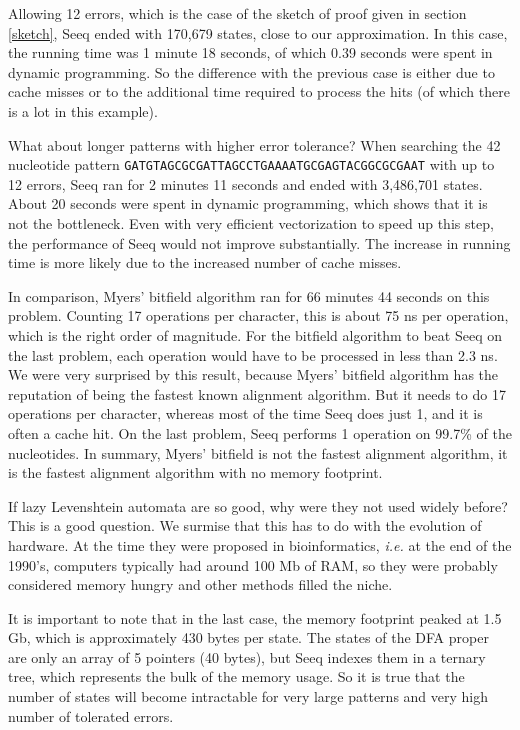 \documentclass[12pt]{article}
\begin{document}
Allowing 12 errors, which is the case of the sketch
of proof given in section \ref{sketch}, Seeq ended with 170,679 states,
close to our approximation. In this case, the running time
was 1 minute 18 seconds, of which 0.39 seconds were spent in dynamic
programming. So the difference with the previous case is either
due to cache misses or to the additional time required to process
the hits (of which there is a lot in this example).

What about longer patterns with higher error tolerance?
When searching the 42 nucleotide pattern
\texttt{GATGTAGCGCGATTAGCCTGAAAATGCGAGTACGGCGCGAAT} with
up to 12 errors, Seeq ran for 2 minutes 11 seconds and ended with
3,486,701 states. About 20 seconds were spent in dynamic programming,
which shows that it is not the bottleneck.
Even with very efficient vectorization to speed up this step, the
performance of Seeq would not improve substantially. The increase
in running time is more likely due to the increased number of cache
misses.

In comparison, Myers' bitfield algorithm ran for 66 minutes
44 seconds on this problem. Counting 17 operations per character,
this is about 75 ns per operation, which is the right order of
magnitude. For the bitfield algorithm to beat Seeq on the last problem,
each operation would have to be processed in less than 2.3 ns. We
were very surprised by this result, because Myers' bitfield
algorithm has the reputation of being the fastest known alignment
algorithm. But it needs to do 17 operations per character, whereas
most of the time Seeq does just 1, and it is often a cache hit. On
the last problem, Seeq performs 1 operation on 99.7\% of the
nucleotides. In summary, Myers' bitfield is not the fastest
alignment algorithm, it is the fastest alignment algorithm with
no memory footprint.

If lazy Levenshtein automata are so good, why were they not used
widely before? This is a good question. We surmise that this has
to do with the evolution of hardware. At the time they were proposed
in bioinformatics, \textit{i.e.} at the end of the 1990's, computers
typically had around 100 Mb of RAM, so they were probably considered
memory hungry and other methods filled the niche.

It is important to note that in the last case, the memory footprint
peaked at 1.5 Gb, which is approximately 430 bytes per state. The
states of the DFA proper are only an array of 5 pointers (40 bytes),
but Seeq indexes them in a ternary tree, which represents the bulk
of the memory usage. So it is true that the number of states will
become intractable for very large patterns and very high number of
tolerated errors.
\end{document}
